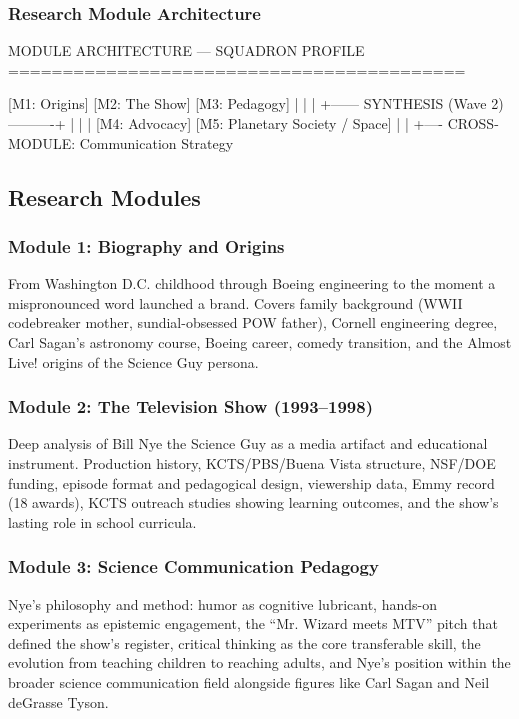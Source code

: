 \documentclass[11pt,letterpaper]{article}
\begin{document}
\subsubsection{Research Module Architecture}

\begin{asciibox}
MODULE ARCHITECTURE --- SQUADRON PROFILE
==========================================

  [M1: Origins]    [M2: The Show]    [M3: Pedagogy]
      |                  |                 |
      +------ SYNTHESIS (Wave 2) ----------+
      |                  |                 |
  [M4: Advocacy]   [M5: Planetary Society / Space]
      |                  |
      +---- CROSS-MODULE: Communication Strategy
\end{asciibox}

\subsection{Research Modules}

\subsubsection{Module 1: Biography and Origins}
From Washington D.C. childhood through Boeing engineering to the moment a mispronounced word launched a brand. Covers family background (WWII codebreaker mother, sundial-obsessed POW father), Cornell engineering degree, Carl Sagan's astronomy course, Boeing career, comedy transition, and the Almost Live! origins of the Science Guy persona.

\subsubsection{Module 2: The Television Show (1993--1998)}
Deep analysis of Bill Nye the Science Guy as a media artifact and educational instrument. Production history, KCTS/PBS/Buena Vista structure, NSF/DOE funding, episode format and pedagogical design, viewership data, Emmy record (18 awards), KCTS outreach studies showing learning outcomes, and the show's lasting role in school curricula.

\subsubsection{Module 3: Science Communication Pedagogy}
Nye's philosophy and method: humor as cognitive lubricant, hands-on experiments as epistemic engagement, the ``Mr. Wizard meets MTV'' pitch that defined the show's register, critical thinking as the core transferable skill, the evolution from teaching children to reaching adults, and Nye's position within the broader science communication field alongside figures like Carl Sagan and Neil deGrasse Tyson.
\end{document}
